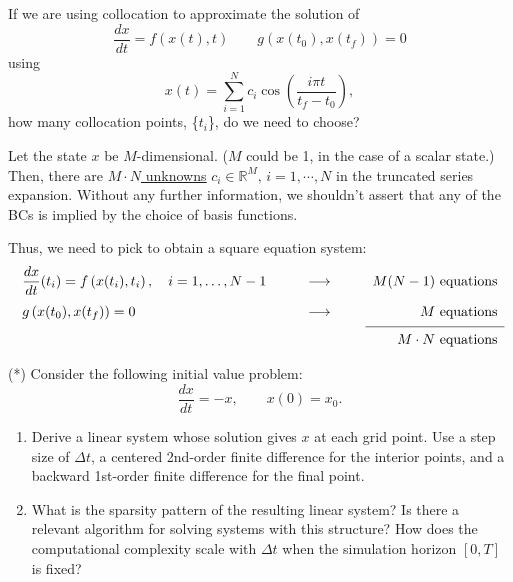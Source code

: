 \begin{exercise} %
    If we are using collocation to approximate the solution of
    \[
        \frac{dx}{dt} = f(x(t),t) \qquad g(x(t_0), x(t_f)) = 0
    \]
    using
    \[
        x(t) = \sum_{i=1}^N c_i \cos \left(\frac{i\pi t}{t_f-t_0}\right),
    \]
    how many collocation points, \{\(t_i\)\}, do we need to choose?
\end{exercise}

\begin{solution}
    Let the state \(x\) be \(M\)-dimensional. (\(M\) could be 1, in the case of a scalar state.) Then, there are \underline{\underline{\(M\cdot N\) unknowns}} \(c_i \in\mathbb{R}^M,\, i=1,\cdots, N\) in the truncated series expansion. Without any further information, we shouldn't assert that any of the BCs is implied by the choice of basis functions.

    Thus, we need to pick  to obtain a square equation system:
    \[
        \begin{array}{llr}
        \dfrac{dx}{dt}(t_i) = f\left(x(t_i),t_i\right),\quad i = 1,\dots,N-1  & \qquad\longrightarrow\qquad & M(N-1) \text{ equations}\\[10pt]
        g\left(x(t_0),x(t_f)\right) = 0                                       & \qquad\longrightarrow\qquad & M \text{ equations}\\[4pt]
              \cline{3-3}\\[-8pt]
          & & M \cdot N \text{ equations}
        \end{array}
    \]
\end{solution}

\begin{exercise} %
    (*) Consider the following initial value problem:
    \[
        \frac{dx}{dt} = -x, \qquad x(0) = x_0.
    \]
    \begin{enumerate}[label=(\alph*)]

        \item Derive a linear system whose solution gives $x$ at each
        grid point.  Use a step size of $\Delta t$, a centered
        2nd-order finite difference for the interior points, and a
        backward 1st-order finite difference for the final point.

        \item What is the sparsity pattern of the resulting linear
        system?  Is there a relevant algorithm for solving systems
        with this structure?  How does the computational complexity
        scale with $\Delta t$ when the simulation horizon $[0, T]$ is
        fixed?

    \end{enumerate}
\end{exercise}

